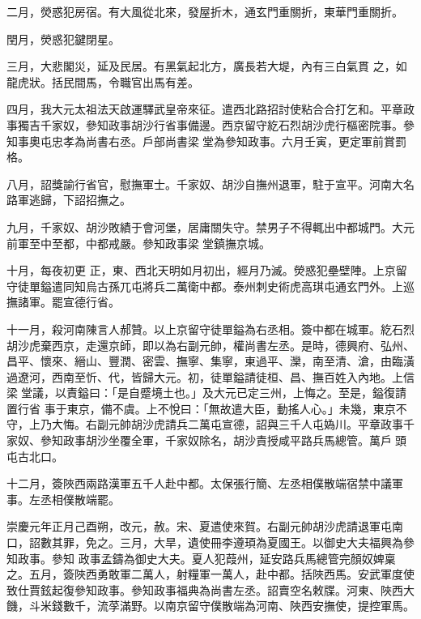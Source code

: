 \begin{pinyinscope}
 二月，熒惑犯房宿。有大風從北來，發屋折木，通玄門重關折，東華門重關折。



 閏月，熒惑犯鍵閉星。



 三月，大悲閣災，延及民居。有黑氣起北方，廣長若大堤，內有三白氣貫
 之，如龍虎狀。括民間馬，令職官出馬有差。



 四月，我大元太祖法天啟運驛武皇帝來征。遣西北路招討使粘合合打乞和。平章政事獨吉千家奴，參知政事胡沙行省事備邊。西京留守紇石烈胡沙虎行樞密院事。參知事奧屯忠孝為尚書右丞。戶部尚書梁堂為參知政事。六月壬寅，更定軍前賞罰格。



 八月，詔獎諭行省官，慰撫軍士。千家奴、胡沙自撫州退軍，駐于宣平。河南大名路軍逃歸，下詔招撫之。



 九月，千家奴、胡沙敗績于會河堡，居庸關失守。禁男子不得輒出中都城門。大元前軍至中至都，中都戒嚴。參知政事梁堂鎮撫京城。



 十月，每夜初更
 正，東、西北天明如月初出，經月乃滅。熒惑犯壘壁陣。上京留守徒單鎰遣同知烏古孫兀屯將兵二萬衛中都。泰州刺史術虎高琪屯通玄門外。上巡撫諸軍。罷宣德行省。



 十一月，殺河南陳言人郝贊。以上京留守徒單鎰為右丞相。簽中都在城軍。紇石烈胡沙虎棄西京，走還京師，即以為右副元帥，權尚書左丞。是時，德興府、弘州、昌平、懷來、縉山、豐潤、密雲、撫寧、集寧，東過平、灤，南至清、滄，由臨潢過遼河，西南至忻、代，皆歸大元。初，徒單鎰請徒桓、昌、撫百姓入內地。上信梁堂議，以責鎰曰：「是自蹙境土也。」及大元已定三州，上悔之。至是，鎰復請置行省
 事于東京，備不虞。上不悅曰：「無故遣大臣，動搖人心。」未幾，東京不守，上乃大悔。右副元帥胡沙虎請兵二萬屯宣德，詔與三千人屯媯川。平章政事千家奴、參知政事胡沙坐覆全軍，千家奴除名，胡沙責授咸平路兵馬總管。萬戶頭屯古北口。



 十二月，簽陜西兩路漢軍五千人赴中都。太保張行簡、左丞相僕散端宿禁中議軍事。左丞相僕散端罷。



 崇慶元年正月己酉朔，改元，赦。宋、夏遣使來賀。右副元帥胡沙虎請退軍屯南口，詔數其罪，免之。三月，大旱，遺使冊李遵頊為夏國王。以御史大夫福興為參知政事。參知
 政事孟鑄為御史大夫。夏人犯葭州，延安路兵馬總管完顏奴婢稟之。五月，簽陜西勇敢軍二萬人，射糧軍一萬人，赴中都。括陜西馬。安武軍度使致仕賈鉉起復參知政事。參知政事福典為尚書左丞。詔賣空名敕牒。河東、陜西大饑，斗米錢數千，流莩滿野。以南京留守僕散端為河南、陜西安撫使，提控軍馬。




\end{pinyinscope}
